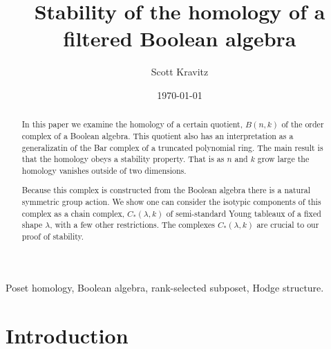 \documentclass{elsart}
\begin{document}
\begin{frontmatter}
\title{Stability of the homology of a filtered Boolean algebra}

\begin{abstract}
 In this paper we examine the homology of a certain quotient, $B(n, k)$ of the order complex of a Boolean algebra. This
quotient also has an interpretation as a generalizatin of the Bar complex of a truncated polynomial ring. The main result
is that the homology obeys a stability property. That is as $n$ and $k$ grow large the homology vanishes outside of two 
dimensions. 

Because this complex is constructed from the Boolean algebra there is a natural symmetric group action. We show
one can consider the isotypic components of this complex as a chain complex, $C_*(\lambda, k)$ of semi-standard Young
tableaux of a fixed shape $\lambda$, with a few other restrictions. The complexes $C_*(\lambda, k)$ are crucial to our
proof of stability.

\end{abstract}

\author{Scott Kravitz}
\address{skravitz@umich.edu, Department of Mathematics, University of Michigan, Ann Arbor, MI 48109-1003} 
\begin{keyword}
Poset homology, Boolean algebra, rank-selected subposet, Hodge structure.
\end{keyword}

\date{\today}     


\end{frontmatter}

\section{Introduction}\label{S:intro}
\end{document}
